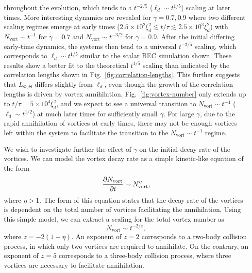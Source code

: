 throughout the evolution, which tends to a $t^{-2/5}$ ($\ell_d \sim t^{1/5}$)
scaling at later times.
More interesting dynamics are revealed for $\gamma=0.7, 0.9$ where two different
scaling regimes emerge at early times ($2.5\times10^2\xi_d^2 \lesssim t/\tau
\lesssim 2.5\times10^3\xi_d^2$) with $N_\mathrm{vort} \sim t^{-1}$ for
$\gamma=0.7$ and $N_\mathrm{vort} \sim t^{-3/2}$ for $\gamma=0.9$.
After the initial differing early-time dynamics, the systems then tend to a
universal $t^{-2/5}$ scaling, which corresponds to $\ell_d\sim t^{1/5}$ similar
to the scalar BEC simulation shown.
These results show a better fit to the theoretical $t^{1/5}$ scaling than 
indicated by the correlation lengths shown in
Fig.~\ref{fig:correlation-lengths}.
This further suggests that $L_{\Phi,\Theta}$ differs slightly from $\ell_d$,
even though the growth of the correlation lengths is driven by vortex
annihilation.
Fig.~\ref{fig:vortex-number} only extends up to $t/\tau=5\times 10^4\xi_d^2$,
and we expect to see a universal transition to
$N_\mathrm{vort}\sim t^{-1}$ ($\ell_d\sim t^{1/2}$) at much later times for
sufficiently small $\gamma$.
For large $\gamma$, due to the rapid annihilation of vortices at early times,
there may not be enough vortices left within the system to facilitate the
transition to the $N_\mathrm{vort} \sim t^{-1}$ regime.
\par
We wish to investigate further the effect of $\gamma$ on the initial decay
rate of the vortices.
We can model the vortex decay rate as a simple kinetic-like equation of the form
\begin{equation}
    \pdv{N_\mathrm{vort}}{t} \sim N_\mathrm{vort}^\eta,
\end{equation}
where $\eta > 1$.
The form of this equation states that the decay rate of the vortices is
dependent on the total number of vortices facilitating the annihilation.
Using this simple model, we can extract a scaling for the total vortex
number as
\begin{equation}
    N_\mathrm{vort} \sim t^{-2/z},
    \label{eq:vortex-number-scaling}
\end{equation}
where $z=-2(1-\eta)$.
An exponent of $z=2$ corresponds to a two-body collision process, in which
only two vortices are required to annihilate.
On the contrary, an exponent of $z=5$ corresponds to a three-body collision
process, where three vortices are necessary to facilitate annihilation.
